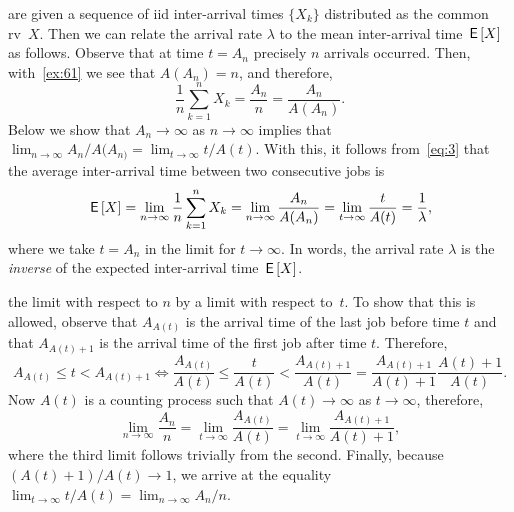  are given a sequence of iid inter-arrival times  $\{X_k\}$  distributed as the common rv~$X$. Then we can relate the arrival rate $\lambda$ to the mean inter-arrival time $\,\mathsf{E}\left[X\right]$ as follows.
Observe that at time $t=A_n$ precisely $n$ arrivals occurred.
Then, with~\cref{ex:61}
we see that $A(A_n) = n$, and therefore,
\begin{equation*}
 \frac{1}n\sum_{k=1}^n X_k = \frac{A_n}n = \frac{A_n}{A(A_n)}.
\end{equation*}
Below we show that $A_n\to\infty$ as $n\to\infty$ implies that $\lim_{n\to\infty} A_n/A(A_{n)} = \lim_{t\to\infty} t/A(t)$. With this, it follows from~\cref{eq:3} that the average inter-arrival time between two consecutive jobs is
\begin{equation}\label{eq:54}
 \,\mathsf{E}\left[X\right] = \lim_{n\to\infty} \frac{1}n\sum_{k=1}^n X_k = \lim_{n\to \infty} \frac{A_n}{A(A_n)} = \lim_{t\to\infty} \frac t{A(t)} = \frac 1 \lambda,
\end{equation}
where we take $t=A_n$ in the limit for $t\to\infty$.
In words, the arrival rate $\lambda$ is the \emph{inverse} of the expected inter-arrival time $\,\mathsf{E}\left[X\right]$.


 the limit with respect to $n$ by a limit with respect to~$t$.
To show that this is allowed, observe that $A_{A(t)}$ is the arrival time of the last job before time $t$ and that $A_{A(t)+1}$ is the arrival time of the first job after time $t$.
Therefore,
 \begin{equation*}
 A_{A(t)} \leq t < A_{A(t)+1} \Leftrightarrow
 \frac{A_{A(t)}} {A(t)} \leq \frac{t}{A(t)} <\frac{A_{A(t)+1}}{A(t)} = \frac{A_{A(t)+1}}{A(t)+1}\frac{A(t)+1}{A(t)}.
 \end{equation*}
 Now $A(t)$ is a counting process such that $A(t)\to\infty$ as $t\to\infty$, therefore,
 \begin{equation*}
\lim_{n\to\infty} \frac{A_n}{n} = \lim_{t\to\infty} \frac{A_{A(t)}}{A(t)} = \lim_{t\to\infty} \frac{A_{A(t)+1}}{A(t)+1},
 \end{equation*}
 where the third limit follows trivially from the second.
 Finally, because $(A(t)+1)/A(t)\to 1$, we arrive at the equality $\lim_{t\to\infty} t/A(t) = \lim_{n\to\infty} A_n/n$.

